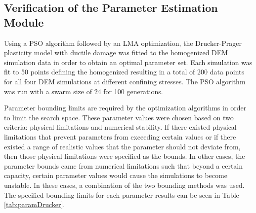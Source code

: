 \subsection{Verification of the Parameter Estimation Module}

Using a PSO algorithm followed by an LMA optimization, the Drucker-Prager plasticity model with ductile damage was fitted to the homogenized DEM simulation data in order to obtain an optimal parameter set. Each simulation was fit to 50 points defining the homogenized resulting in a total of 200 data points for all four DEM simulations at different confining stresses. The PSO algorithm was run with a swarm size of 24 for 100 generations.

Parameter bounding limits are required by the optimization algorithms in order to limit the search space. These parameter values were chosen based on two criteria: physical limitations and numerical stability. If there existed physical limitations that prevent parameters from exceeding certain values or if there existed a range of realistic values that the parameter should not deviate from, then those physical limitations were specified as the bounds. In other cases, the parameter bounds came from numerical limitations such that beyond a certain capacity, certain parameter values would cause the simulations to become unstable. In these cases, a combination of the two bounding methods was used. The specified bounding limits for each parameter results can be seen in Table \ref{tab:paramDrucker}.

